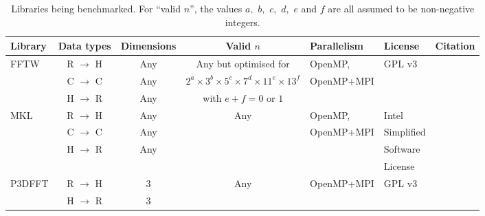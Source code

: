 \documentclass[a4paper]{article}
\begin{document}
\begin{table}[ht]
\begin{center}
\begin{small}
\begin{tabular}{|l|c|c|c|l|l|c|}
\hline
\textbf{Library} & \textbf{Data types} & \textbf{Dimensions} & \textbf{Valid $n$} & \textbf{Parallelism} & \textbf{License} & \textbf{Citation} \\ \hline
FFTW & R $\rightarrow$ H & Any   & Any but optimised for  & OpenMP, & GPL v3 & \cite{FFTW} \\
     & C $\rightarrow$ C & Any      & $2^a\times 3^b\times 5^c\times 7^d\times 11^e\times 13^f$ &  OpenMP+MPI & & \\
     & H $\rightarrow$ R & Any      & with $e+f = 0$ or $1$ & & & \\ \hline
MKL  & R $\rightarrow$ H & Any   & Any & OpenMP, & Intel & \cite{MKL} \\
     & C $\rightarrow$ C & Any      & & OpenMP+MPI &  Simplified & \\
     & H $\rightarrow$ R & Any   & & & Software  & \\ 
     &  &    & & &  License  & \\ \hline
P3DFFT & R $\rightarrow$ H & 3   & Any & OpenMP+MPI & GPL v3 & \cite{P3DFFT} \\
     & H $\rightarrow$ R & 3   & & & & \\ \hline

\end{tabular}
\caption{Libraries being benchmarked.  For ``valid $n$'', the values $a,$ $b,$ $c,$ $d,$ $e$ and $f$ are all assumed to be non-negative integers.}\label{Tbllibs}
\end{small}
\end{center}
\end{table}
\end{document}
